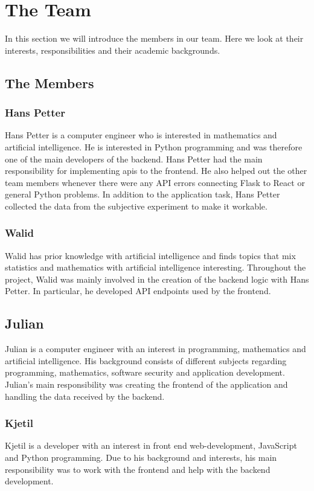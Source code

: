 \section{The Team}
In this section we will introduce the members in our team. Here we look at their interests, responsibilities and their academic backgrounds. 

\subsection{The Members}

\subsubsection*{Hans Petter}
Hans Petter is a computer engineer who is interested in mathematics and artificial intelligence. He is interested in Python programming and was therefore one of the main developers of the backend. Hans Petter had the main responsibility for implementing \acrshort{api}s to the frontend. He also helped out the other team members whenever there were any API errors connecting Flask to React or general Python problems. In addition to the application task, Hans Petter collected the data from the subjective experiment to make it workable. 

\subsubsection*{Walid}
Walid has prior knowledge with artificial intelligence and finds topics that mix statistics and mathematics with artificial intelligence interesting. Throughout the project, Walid was mainly involved in the creation of the backend logic with Hans Petter. In particular, he developed API endpoints used by the frontend. 

\subsection*{Julian}
Julian is a computer engineer with an interest in programming, mathematics and artificial intelligence. His background consists of different subjects regarding programming, mathematics, software security and application development. Julian's main responsibility was creating the frontend of the application and handling the data received by the backend. 

\subsubsection*{Kjetil}
Kjetil is a developer with an interest in front end web-development, JavaScript and Python programming. Due to his background and interests, his main responsibility was to work with the frontend and help with the backend development. 


